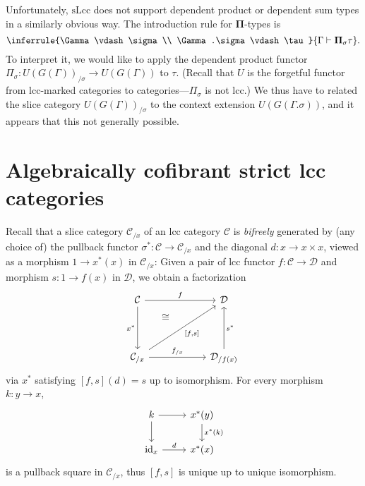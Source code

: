 \documentclass[a4paper]{article}
\theoremstyle{remark}
\theoremstyle{definition}
\begin{document}
Unfortunately, $\mathrm{sLcc}$ does not support dependent product or dependent sum types in a similarly obvious way.
The introduction rule for $\mathbf{\Pi}$-types is
\begin{equation}
  \inferrule
  {\Gamma \vdash \sigma \\ \Gamma.\sigma \vdash \tau}
  {\Gamma \vdash \mathbf{\Pi}_\sigma \tau}.
\end{equation}
To interpret it, we would like to apply the dependent product functor $\Pi_\sigma : U(G(\Gamma))_{/ \sigma} \rightarrow U(G(\Gamma))$ to $\tau$.
(Recall that $U$ is the forgetful functor from lcc-marked categories to categories---$\Pi_\sigma$ is not lcc.)
We thus have to related the slice category $U(G(\Gamma))_{/ \sigma}$ to the context extension $U(G(\Gamma.\sigma))$, and it appears that this not generally possible.

\section{Algebraically cofibrant strict lcc categories}
\label{sec:algebraically-cofibrant}

Recall that a slice category $\mathcal{C}_{/ x}$ of an lcc category $\mathcal{C}$ is \emph{bifreely} generated by (any choice of) the pullback functor $\sigma^* : \mathcal{C} \rightarrow \mathcal{C}_{/ x}$ and the diagonal $d : x \rightarrow x \times x$, viewed as a morphism $1 \rightarrow x^*(x)$ in $\mathcal{C}_{/ x}$:
Given a pair of lcc functor $f : \mathcal{C} \rightarrow \mathcal{D}$ and morphism $s : 1 \rightarrow f(x)$ in $\mathcal{D}$, we obtain a factorization
\begin{equation}
  \begin{tikzcd}
    \mathcal{C} \arrow[rr, "f"] \arrow[dd, "x^*"'] & \, & \mathcal{D} \\
    & & \, \\
    \mathcal{C}_{/ x} \arrow[rr, "f_{/ x}"] \arrow[uur, phantom, "\cong", near end] \arrow[uurr, "{[f, s]}"'] & & \mathcal{D}_{/ f(x)} \arrow[uu, "s^*"']
  \end{tikzcd}
\end{equation}
via $x^*$ satisfying $[f, s](d) = s$ up to isomorphism.
For every morphism $k : y \rightarrow x$,
\begin{equation}
  \begin{tikzcd}
    k \arrow[r] \arrow[d] & x^*(y) \arrow[d, "x^*(k)"] \\
    \mathrm{id}_x \arrow[r, "d"] & x^*(x)
  \end{tikzcd}
\end{equation}
is a pullback square in $\mathcal{C}_{/ x}$, thus $[f, s]$ is unique up to unique isomorphism.
\end{document}
